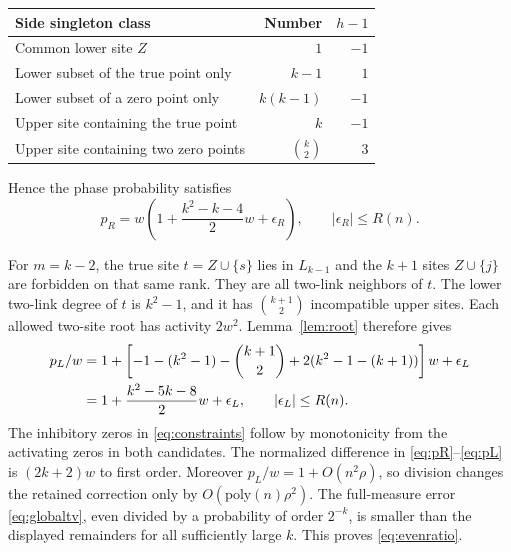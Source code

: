 \documentclass[11pt]{article}
\theoremstyle{remark}\newtheorem{remark}[theorem]{Remark}
\begin{document}
\begin{center}
\begin{tabular}{lrr}\toprule
Side singleton class & Number & $h-1$\\\midrule
Common lower site $Z$ & $1$ & $-1$\\
Lower subset of the true point only & $k-1$ & $1$\\
Lower subset of a zero point only & $k(k-1)$ & $-1$\\
Upper site containing the true point & $k$ & $-1$\\
Upper site containing two zero points & $\binom k2$ & $3$\\\bottomrule
\end{tabular}
\end{center}
Hence the phase probability satisfies
\begin{equation}\label{eq:pR}
 p_R=w\left(1+\frac{k^2-k-4}{2}w+\epsilon_R\right),
 \qquad |\epsilon_R|\le R(n).
\end{equation}

For $m=k-2$, the true site $t=Z\cup\{s\}$ lies in $L_{k-1}$ and
the $k+1$ sites $Z\cup\{j\}$ are forbidden on that same rank.
They are all two-link neighbors of $t$. The lower two-link degree of $t$
is $k^2-1$, and it has $\binom{k+1}2$ incompatible upper sites.
Each allowed two-site root has activity $2w^2$. Lemma~\ref{lem:root}
therefore gives
\begin{align}\label{eq:pL}
 p_L/w
 &=1+\left[-1-(k^2-1)-\binom{k+1}2
                  +2(k^2-1-(k+1))\right]w+\epsilon_L\notag\\
 &=1+\frac{k^2-5k-8}{2}w+\epsilon_L,
 \qquad |\epsilon_L|\le R(n).
\end{align}
The inhibitory zeros in \eqref{eq:constraints} follow by monotonicity
from the activating zeros in both candidates. The normalized difference
in \eqref{eq:pR}--\eqref{eq:pL} is $(2k+2)w$ to first order.
Moreover $p_L/w=1+O(n^2\rho)$, so division changes the retained
correction only by $O(\mathrm{poly}(n)\rho^2)$.
The full-measure error \eqref{eq:globaltv}, even divided by a probability
of order $2^{-k}$, is smaller than the displayed remainders for all
sufficiently large $k$. This proves \eqref{eq:evenratio}.
\end{document}
